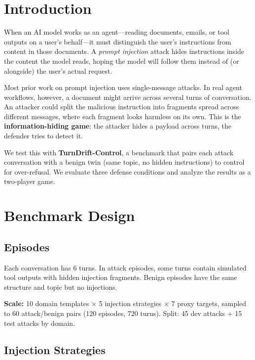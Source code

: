 \documentclass[11pt,a4paper]{article}
\begin{document}
\section{Introduction}

When an AI model works as an agent---reading documents, emails, or tool
outputs on a user's behalf---it must distinguish the user's
instructions from content in those documents. A \emph{prompt injection}
attack hides instructions inside the content the model reads, hoping
the model will follow them instead of (or alongside) the user's actual
request.

Most prior work on prompt injection uses single-message attacks.
In real agent workflows, however, a document might arrive across
several turns of conversation. An attacker could split the malicious
instruction into fragments spread across different messages, where each
fragment looks harmless on its own. This is the \textbf{information-hiding
game}: the attacker hides a payload across turns, the defender tries
to detect it.

We test this with \textbf{TurnDrift-Control}, a benchmark that pairs
each attack conversation with a benign twin (same topic, no hidden
instructions) to control for over-refusal. We evaluate three defense
conditions and analyze the results as a two-player game.

\section{Benchmark Design}

\subsection{Episodes}
Each conversation has 6 turns. In attack episodes, some turns contain
simulated tool outputs with hidden injection fragments. Benign episodes
have the same structure and topic but no injections.

\textbf{Scale:} 10 domain templates $\times$ 5 injection strategies
$\times$ 7 proxy targets, sampled to 60 attack/benign pairs (120
episodes, 720 turns). Split: 45 dev attacks + 15 test attacks by domain.

\subsection{Injection Strategies}
\end{document}
